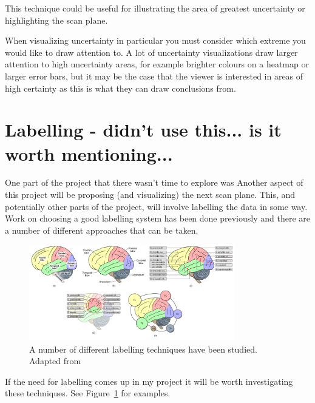 This technique could be useful for illustrating the area of greatest uncertainty or highlighting the scan plane.

When visualizing uncertainty in particular you must consider which extreme you would like to draw attention to. A lot of uncertainty visualizations draw larger attention to high uncertainty areas, for example brighter colours on a heatmap or larger error bars, but it may be the case that the viewer is interested in areas of high certainty as this is what they can draw conclusions from.

\newpage
\section{Labelling - didn't use this... is it worth mentioning...}\label{background:labelling}
One part of the project that there wasn't time to explore was Another aspect of this project will be proposing (and visualizing) the next scan plane. This, and potentially other parts of the project, will involve labelling the data in some way. Work on choosing a good labelling system has been done previously and there are a number of different approaches that can be taken\cite{labelling}.

\begin{figure}[h]
    \centering
	\includegraphics[width=0.8\textwidth]{images/background/labels.png}
    \caption{A number of different labelling techniques have been studied. Adapted from \cite{labelling}}
    \label{fig:labels}
\end{figure}

If the need for labelling comes up in my project it will be worth investigating these techniques. See Figure~\ref{fig:labels} for examples.